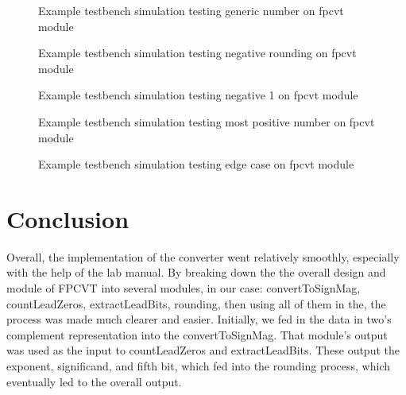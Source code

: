 \documentclass{article}
\begin{document}
\begin{figure}[H]
	\begin{center}
		\caption{Example testbench simulation testing generic number on fpcvt module}
	\end{center}
\end{figure}

\begin{figure}[H]
	\begin{center}
		\caption{Example testbench simulation testing negative rounding on fpcvt module}
	\end{center}
\end{figure}

\begin{figure}[H]
	\begin{center}
		\caption{Example testbench simulation testing negative 1 on fpcvt module}
	\end{center}
\end{figure}

\begin{figure}[H]
	\begin{center}
		\caption{Example testbench simulation testing most positive number on fpcvt module}
	\end{center}
\end{figure}

\begin{figure}[H]
	\begin{center}
		\caption{Example testbench simulation testing edge case on fpcvt module}
	\end{center}
\end{figure}

\section*{Conclusion}


Overall, the implementation of the converter went relatively smoothly, especially with the help of the lab manual.  By breaking down the the overall design and module of FPCVT into several modules, in our case: convertToSignMag, countLeadZeros, extractLeadBits, rounding, then using all of them in the, the process was made much clearer and easier.  Initially, we fed in the data in two's complement representation into the convertToSignMag.  That module's output was used as the input to countLeadZeros and extractLeadBits.  These output the exponent, significand, and fifth bit, which fed into the rounding process, which eventually led to the overall output. \\
\end{document}
